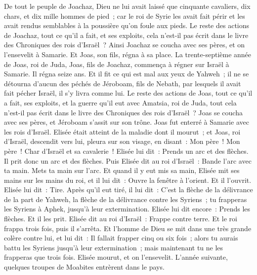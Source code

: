 \begin{multicols}{2}
De tout le peuple de Joachaz, Dieu ne lui avait laissé que cinquante cavaliers, dix chars, et dix mille hommes de pied~; car le roi de Syrie les avait fait périr et les avait rendus semblables à la poussière qu'on foule aux pieds.
Le reste des actions de Joachaz, tout ce qu'il a fait, et ses exploits, cela n'est-il pas écrit dans le livre des Chroniques des rois d'Israël~?
Ainsi Joachaz se coucha avec ses pères, et on l'ensevelit à Samarie. Et Joas, son fils, régna à sa place.
La trente-septième année de Joas, roi de Juda, Joas, fils de Joachaz, commença à régner sur Israël à Samarie. Il régna seize ans.
Et il fit ce qui est mal aux yeux de Yahweh~; il ne se détourna d'aucun des péchés de Jéroboam, fils de Nebath, par lesquels il avait fait pécher Israël, il s'y livra comme lui.
Le reste des actions de Joas, tout ce qu'il a fait, ses exploits, et la guerre qu'il eut avec Amatsia, roi de Juda, tout cela n'est-il pas écrit dans le livre des Chroniques des rois d'Israël~?
Joas se coucha avec ses pères, et Jéroboam s'assit sur son trône. Joas fut enterré à Samarie avec les rois d'Israël.
Elisée était atteint de la maladie dont il mourut~; et Joas, roi d'Israël, descendit vers lui, pleura sur son visage, en disant~: Mon père~! Mon père~! Char d'Israël et sa cavalerie~!
Elisée lui dit~: Prends un arc et des flèches. Il prit donc un arc et des flèches.
Puis Elisée dit au roi d'Israël~: Bande l'arc avec ta main. Mets ta main sur l'arc. Et quand il y eut mis sa main, Elisée mit ses mains sur les mains du roi,
et il lui dit~: Ouvre la fenêtre à l'orient. Et il l'ouvrit. Elisée lui dit~: Tire. Après qu'il eut tiré, il lui dit~: C'est la flèche de la délivrance de la part de Yahweh, la flèche de la délivrance contre les Syriens~; tu frapperas les Syriens à Aphek, jusqu'à leur extermination.
Elisée lui dit encore~: Prends les flèches. Et il les prit. Elisée dit au roi d'Israël~: Frappe contre terre. Et le roi frappa trois fois, puis il s'arrêta.
Et l'homme de Dieu se mit dans une très grande colère contre lui, et lui dit~: Il fallait frapper cinq ou six fois~; alors tu aurais battu les Syriens jusqu'à leur extermination~; mais maintenant tu ne les frapperas que trois fois.
Elisée mourut, et on l'ensevelit. L'année suivante, quelques troupes de Moabites entrèrent dans le pays.

\end{multicols}

